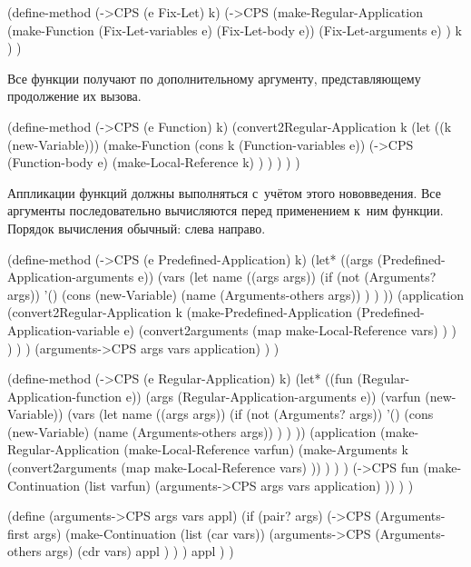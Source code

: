 
\begin{code:lisp}
(define-method (->CPS (e Fix-Let) k)
  (->CPS (make-Regular-Application
          (make-Function (Fix-Let-variables e) (Fix-Let-body e))
          (Fix-Let-arguments e) )
         k ) )
\end{code:lisp}

Все функции получают по дополнительному аргументу, представляющему продолжение
их вызова.

\begin{code:lisp}
(define-method (->CPS (e Function) k)
  (convert2Regular-Application k
   (let ((k (new-Variable)))
     (make-Function (cons k (Function-variables e))
                    (->CPS (Function-body e)
                           (make-Local-Reference k) ) ) ) ) )
\end{code:lisp}

Аппликации функций должны выполняться с~учётом этого нововведения. Все аргументы
последовательно вычисляются перед применением к~ним функции. Порядок вычисления
обычный: слева направо.

\begin{code:lisp}
(define-method (->CPS (e Predefined-Application) k)
  (let* ((args (Predefined-Application-arguments e))
         (vars (let name ((args args))
                 (if (not (Arguments? args)) '()
                     (cons (new-Variable)
                           (name (Arguments-others args)) ) ) ))
         (application
          (convert2Regular-Application k
           (make-Predefined-Application
            (Predefined-Application-variable e)
            (convert2arguments
             (map make-Local-Reference vars) ) ) ) ) )
    (arguments->CPS args vars application) ) )

(define-method (->CPS (e Regular-Application) k)
  (let* ((fun (Regular-Application-function e))
         (args (Regular-Application-arguments e))
         (varfun (new-Variable))
         (vars (let name ((args args))
                 (if (not (Arguments? args)) '()
                     (cons (new-Variable)
                           (name (Arguments-others args)) ) ) ))
         (application
          (make-Regular-Application
           (make-Local-Reference varfun)
           (make-Arguments k (convert2arguments
                              (map make-Local-Reference vars) )) ) ) )
    (->CPS fun (make-Continuation
                (list varfun)
                (arguments->CPS args vars application) )) ) )

(define (arguments->CPS args vars appl)
  (if (pair? args)
      (->CPS (Arguments-first args)
             (make-Continuation
              (list (car vars))
              (arguments->CPS (Arguments-others args)
                              (cdr vars) appl ) ) )
      appl ) )
\end{code:lisp}

